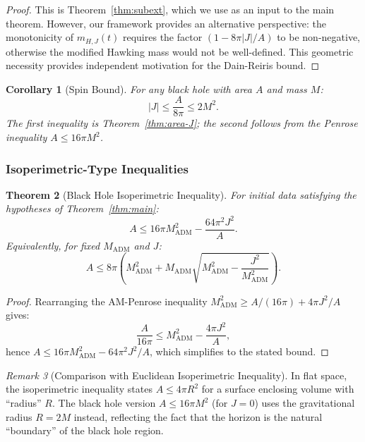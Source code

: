 \documentclass[12pt]{article}
\theoremstyle{plain}
\newtheorem{theorem}{Theorem}[section]
\newtheorem{corollary}[theorem]{Corollary}
\theoremstyle{definition}
\theoremstyle{remark}
\newtheorem{remark}[theorem]{Remark}
\newcommand{\ADM}{\mathrm{ADM}}
\begin{document}
\begin{proof}
This is Theorem~\ref{thm:subext}, which we use as an input to the main theorem. However, our framework provides an alternative perspective: the monotonicity of $m_{H,J}(t)$ requires the factor $(1 - 8\pi|J|/A)$ to be non-negative, otherwise the modified Hawking mass would not be well-defined. This geometric necessity provides independent motivation for the Dain-Reiris bound.
\end{proof}

\begin{corollary}[Spin Bound]
For any black hole with area $A$ and mass $M$:
\begin{equation}
    |J| \leq \frac{A}{8\pi} \leq 2M^2.
\end{equation}
The first inequality is Theorem~\ref{thm:area-J}; the second follows from the Penrose inequality $A \leq 16\pi M^2$.
\end{corollary}

\subsubsection{Isoperimetric-Type Inequalities}

\begin{theorem}[Black Hole Isoperimetric Inequality]\label{thm:isoperimetric}
For initial data satisfying the hypotheses of Theorem~\ref{thm:main}:
\begin{equation}
    A \leq 16\pi M_{\ADM}^2 - \frac{64\pi^2 J^2}{A}.
\end{equation}
Equivalently, for fixed $M_{\ADM}$ and $J$:
\begin{equation}
    A \leq 8\pi\left(M_{\ADM}^2 + M_{\ADM}\sqrt{M_{\ADM}^2 - \frac{J^2}{M_{\ADM}^2}}\right).
\end{equation}
\end{theorem}

\begin{proof}
Rearranging the AM-Penrose inequality $M_{\ADM}^2 \geq A/(16\pi) + 4\pi J^2/A$ gives:
\[
\frac{A}{16\pi} \leq M_{\ADM}^2 - \frac{4\pi J^2}{A},
\]
hence $A \leq 16\pi M_{\ADM}^2 - 64\pi^2 J^2/A$, which simplifies to the stated bound.
\end{proof}

\begin{remark}[Comparison with Euclidean Isoperimetric Inequality]
In flat space, the isoperimetric inequality states $A \leq 4\pi R^2$ for a surface enclosing volume with ``radius'' $R$. The black hole version $A \leq 16\pi M^2$ (for $J = 0$) uses the gravitational radius $R = 2M$ instead, reflecting the fact that the horizon is the natural ``boundary'' of the black hole region.
\end{remark}
\end{document}
